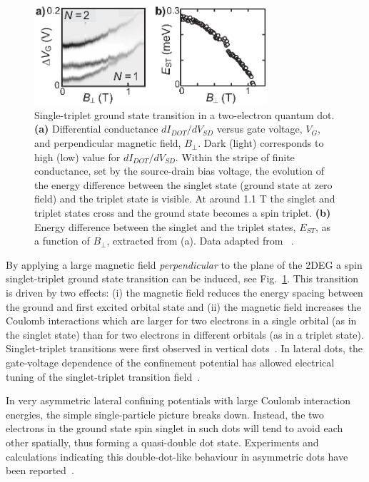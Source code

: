 \documentclass[12pt,aps,nofootinbib]{revtex4-1}
\begin{document}
\begin{figure}[htb]
\includegraphics[width=3.4in]{hanson_fig09.eps}
\caption{Single-triplet ground state transition in a two-electron
quantum dot. \textbf{(a)} Differential conductance
$dI_{DOT}/dV_{SD}$ versus gate voltage, $V_G$, and perpendicular
magnetic field, $B_{\bot}$. Dark (light) corresponds to high (low)
value for $dI_{DOT}/dV_{SD}$. Within the stripe of finite
conductance, set by the source-drain bias voltage, the evolution
of the energy difference between the singlet state (ground state
at zero field) and the triplet state is visible. At around 1.1 T
the singlet and triplet states cross and the ground state becomes
a spin triplet. \textbf{(b)} Energy difference between the singlet
and the triplet states, $E_{ST}$, as a function of $B_{\bot}$,
extracted from (a). Data adapted from
~\textcite{Kyriakidis02}.} \label{Fig:STcrossing}
\end{figure}

By applying a large magnetic field \textit{perpendicular} to the
plane of the 2DEG a spin singlet-triplet ground state transition
can be induced, see Fig.~\ref{Fig:STcrossing}. This transition is
driven by two effects: (i) the magnetic field reduces the energy
spacing between the ground and first excited orbital state and
(ii) the magnetic field increases the Coulomb interactions which
are larger for two electrons in a single orbital (as in the
singlet state) than for two electrons in different orbitals (as in
a triplet state). Singlet-triplet transitions were first observed
in vertical dots~\cite{SuPRB1992,kouwenhoven01}. In lateral dots, the
gate-voltage dependence of the confinement potential has allowed
electrical tuning of the singlet-triplet transition
field~\cite{Kyriakidis02,ZumbuhlPRL2004}.

In very asymmetric lateral confining potentials with large Coulomb interaction energies, the simple single-particle picture breaks down. Instead, the two electrons in the ground state spin singlet in such dots will tend to avoid each other spatially, thus forming a quasi-double dot state. Experiments and calculations indicating this double-dot-like behaviour in asymmetric dots have been reported~\cite{ZumbuhlPRL2004,EllenbergerPRL2006}.
\end{document}

